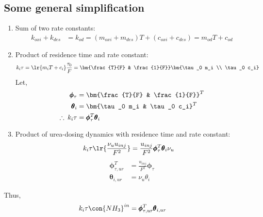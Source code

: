 \subsection{Some general simplification}
\begin{enumerate}
        \item Sum of two rate constants:
        \begin{align}
                k_{oxi} + k_{des} &= k_{od} = (m_{oxi} + m_{des}) T + (c_{oxi} + c_{des}) = m_{od} T + c_{od} \label{eqn::k_sum}
        \end{align}
        \item Product of residence time and rate constant:
        \begin{align*}
        k_i \tau  = \lr{m_i T + c_i} \frac{\tau_0}{F} = \bm{\frac{T}{F} & \frac{1}{F}} \bm{\tau_0 m_i \\ \tau_0 c_i}
        \end{align*}
        Let,
        \begin{align}
                \pmb \phi_\tau &= \bm{\frac{T}{F} & \frac{1}{F}}^T  \label{eqn::phi_tau}\\
                \pmb \theta_i &= \bm{\tau_0 m_i &
                                     \tau_0 c_i}^T          \label{eqn::theta_i}\\
                \therefore \: k_i \tau &= \pmb \phi_\tau^T \pmb \theta_i   \label{eqn::tau_ki}
        \end{align}
        \item Product of urea-dosing dynamics with residence time and rate constant:
        \begin{align*}
        k_{i} \tau \lr{\frac{\nu_u u_{inj}}{F^2}} &= \frac{u_{inj}}{F^2} \pmb \phi_\tau^T \pmb \theta_i \nu_u
        \end{align*}
        \begin{align}
        \pmb\phi_{\tau,ur}^T &= \frac{u_{inj}}{F^2}  \pmb \phi_\tau \\
        \pmb \theta_{i,ur}  &= \nu_u \theta_i
        \end{align}
\end{enumerate}
Thus,
\begin{align}
        k_i \tau \con{NH_3}^{in} &= \pmb \phi_{\tau, ur}^T \pmb \theta_{i, ur}   \label{eqn::k_tau_urea}
\end{align}

